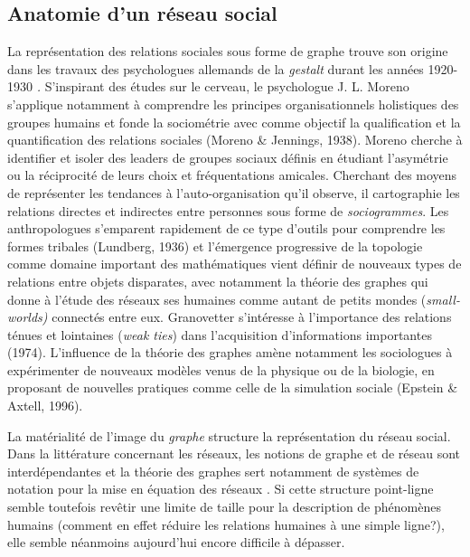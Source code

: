 \subsection[Anatomie d{\textquoteright}un r\'eseau social]{ Anatomie d{\textquoteright}un r\'eseau social}
La repr\'esentation des relations sociales sous forme de graphe trouve
son origine dans les travaux des psychologues allemands de la
\textit{gestalt }durant les ann\'ees 1920-1930 \cite{Scott1988}\textit{.
}S{\textquoteright}inspirant des \'etudes sur le cerveau, le
psychologue J. L. Moreno s{\textquoteright}applique notamment \`a
comprendre les principes organisationnels holistiques des groupes
humains et fonde la sociom\'etrie avec comme objectif la qualification
et la quantification des relations sociales (Moreno \& Jennings, 1938).
Moreno cherche \`a identifier et isoler des leaders de groupes sociaux
d\'efinis en \'etudiant l{\textquoteright}asym\'etrie ou la
r\'eciprocit\'e de leurs choix et fr\'equentations amicales. Cherchant
des moyens de repr\'esenter les tendances \`a
l{\textquoteright}auto-organisation qu{\textquoteright}il observe, il
cartographie les relations directes et indirectes entre personnes sous
forme de \textit{sociogrammes}. Les anthropologues
s{\textquoteright}emparent rapidement de ce type
d{\textquoteright}outils pour comprendre les formes tribales (Lundberg,
1936) et l{\textquoteright}\'emergence progressive de la topologie
comme domaine important des math\'ematiques vient d\'efinir de nouveaux
types de relations entre objets disparates, avec notamment la th\'eorie
des graphes qui donne \`a l{\textquoteright}\'etude des r\'eseaux ses
 humaines comme autant de petits mondes (\textit{small-worlds)}
connect\'es entre eux. Granovetter s{\textquoteright}int\'eresse \`a
l{\textquoteright}importance des relations t\'enues et lointaines
(\textit{weak ties}) dans l{\textquoteright}acquisition
d{\textquoteright}informations importantes (1974).
L{\textquoteright}influence de la th\'eorie des graphes am\`ene
notamment les sociologues \`a exp\'erimenter de nouveaux mod\`eles
venus de la physique ou de la biologie, en proposant de nouvelles
pratiques comme celle de la simulation sociale (Epstein \& Axtell,
1996).



La mat\'erialit\'e de l{\textquoteright}image du \textit{graphe}
structure la repr\'esentation du r\'eseau social. Dans la litt\'erature
concernant les r\'eseaux, les notions de graphe et de r\'eseau sont
interd\'ependantes et la th\'eorie des graphes sert notamment de
syst\`emes de notation pour la mise en \'equation des r\'eseaux
\cite{Nettleton2013}. Si cette structure point-ligne semble toutefois
rev\^etir une limite de taille pour la description de ph\'enom\`enes
humains (comment en effet r\'eduire les relations humaines \`a une
simple ligne?), elle semble n\'eanmoins aujourd{\textquoteright}hui
encore difficile \`a d\'epasser.

